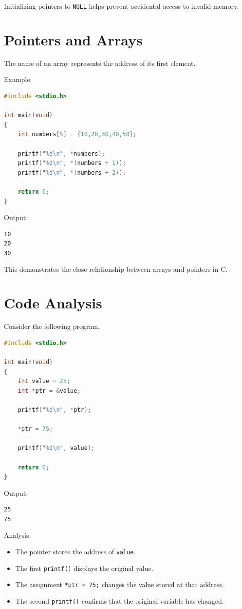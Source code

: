 \documentclass[12pt,openany]{book}
\begin{document}
Initializing pointers to \texttt{NULL} helps prevent accidental access to invalid memory.

\section{Pointers and Arrays}

The name of an array represents the address of its first element.

Example:

\begin{lstlisting}[language=C]
#include <stdio.h>

int main(void)
{
    int numbers[5] = {10,20,30,40,50};

    printf("%d\n", *numbers);
    printf("%d\n", *(numbers + 1));
    printf("%d\n", *(numbers + 2));

    return 0;
}
\end{lstlisting}

Output:

\begin{lstlisting}
10
20
30
\end{lstlisting}

This demonstrates the close relationship between arrays and pointers in C.

\section{Code Analysis}

Consider the following program.

\begin{lstlisting}[language=C]
#include <stdio.h>

int main(void)
{
    int value = 25;
    int *ptr = &value;

    printf("%d\n", *ptr);

    *ptr = 75;

    printf("%d\n", value);

    return 0;
}
\end{lstlisting}

Output:

\begin{lstlisting}
25
75
\end{lstlisting}

Analysis:

\begin{itemize}
    \item The pointer stores the address of \texttt{value}.
    \item The first \texttt{printf()} displays the original value.
    \item The assignment \texttt{*ptr = 75;} changes the value stored at that address.
    \item The second \texttt{printf()} confirms that the original variable has changed.
\end{itemize}
\end{document}
